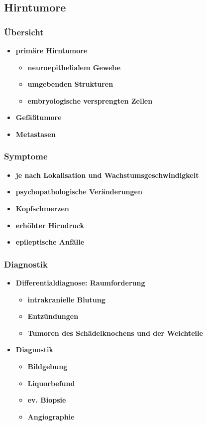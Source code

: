 \subsection{Hirntumore}
	\subsubsection{Übersicht}
		\begin{itemize}
			\item \textbf{primäre Hirntumore}
				\begin{itemize}
					\item \textbf{neuroepithelialem Gewebe}
					\item \textbf{umgebenden Strukturen}
					\item \textbf{embryologische versprengten Zellen}
				\end{itemize}
			\item \textbf{Gefäßtumore}
			\item \textbf{Metastasen}
		\end{itemize}
	\subsubsection{Symptome}
		\begin{itemize}
			\item \textbf{je nach Lokalisation und Wachstumsgeschwindigkeit}
			\item \textbf{psychopathologische Veränderungen}
			\item \textbf{Kopfschmerzen}
			\item \textbf{erhöhter Hirndruck}
			\item \textbf{epileptische Anfälle}
		\end{itemize}
	\subsubsection{Diagnostik}
		\begin{itemize}
			\item \textbf{Differentialdiagnose: Raumforderung}
				\begin{itemize}
					\item \textbf{intrakranielle Blutung}
					\item \textbf{Entzündungen}
					\item \textbf{Tumoren des Schädelknochens und der Weichteile} 
				\end{itemize}
			\item \textbf{Diagnostik}
				\begin{itemize}
					\item \textbf{Bildgebung}
					\item \textbf{Liquorbefund}
					\item \textbf{ev. Biopsie}
					\item \textbf{Angiographie}
				\end{itemize}
		\end{itemize}
